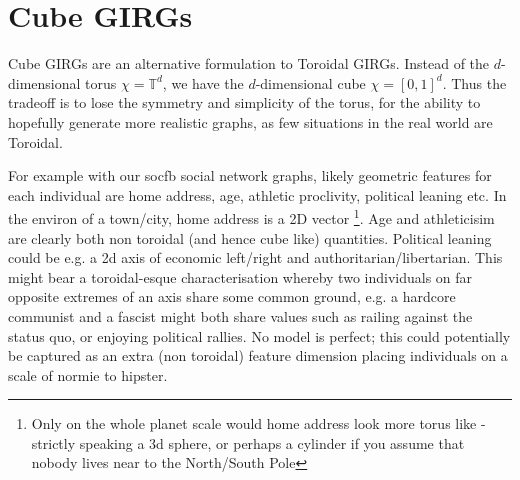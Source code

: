 




\section{Cube GIRGs}

Cube GIRGs are an alternative formulation to Toroidal GIRGs. Instead of the $d$-dimensional torus $\chi = \mathbb{T}^d$, we have the $d$-dimensional cube $\chi = [0,1]^d$. Thus the tradeoff is to lose the symmetry and simplicity of the torus, for the ability to hopefully generate more realistic graphs, as few situations in the real world are Toroidal.


For example with our socfb social network graphs, likely geometric features for each individual are home address, age, athletic proclivity, political leaning etc.
In the environ of a town/city, home address is a 2D vector
\footnote{Only on the whole planet scale would home address look more torus like - strictly speaking a 3d sphere, or perhaps a cylinder if you assume that nobody lives near to the North/South Pole}.
Age and athleticisim are clearly both non toroidal (and hence cube like) quantities.
Political leaning could be e.g. a 2d axis of economic left/right and authoritarian/libertarian. This might bear a toroidal-esque characterisation whereby two individuals on far opposite extremes of an axis share some common ground, e.g. a hardcore communist and a fascist might both share values such as railing against the status quo, or enjoying political rallies.
No model is perfect; this could potentially be captured as an extra (non toroidal) feature dimension placing individuals on a scale of normie to hipster.

